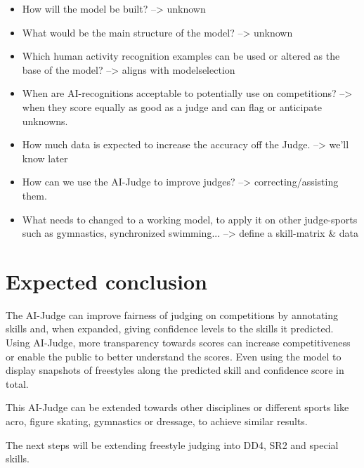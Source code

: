 \begin{itemize}
    \item How will the model be built? --> unknown
    \item What would be the main structure of the model? --> unknown
    \item Which human activity recognition examples can be used or altered as the base of the model? --> aligns with modelselection
    \item When are AI-recognitions acceptable to potentially use on competitions? --> when they score equally as good as a judge and can flag or anticipate unknowns.
    \item How much data is expected to increase the accuracy off the Judge. --> we'll know later
    \item How can we use the AI-Judge to improve judges? --> correcting/assisting them.
    \item What needs to changed to a working model, to apply it on other judge-sports such as gymnastics, synchronized swimming... --> define a skill-matrix \& data
\end{itemize}


\section{Expected conclusion}%
\label{sec:conclusion}

The AI-Judge can improve fairness of judging on competitions by annotating skills and, when expanded, giving confidence levels to the skills it predicted. Using AI-Judge, more transparency towards scores can increase competitiveness or enable the public to better understand the scores. Even using the model to display snapshots of freestyles along the predicted skill and confidence score in total.

This AI-Judge can be extended towards other disciplines or different sports like acro, figure skating, gymnastics or dressage, to achieve similar results.
    
The next steps will be extending freestyle judging into DD4, SR2 and special skills.
